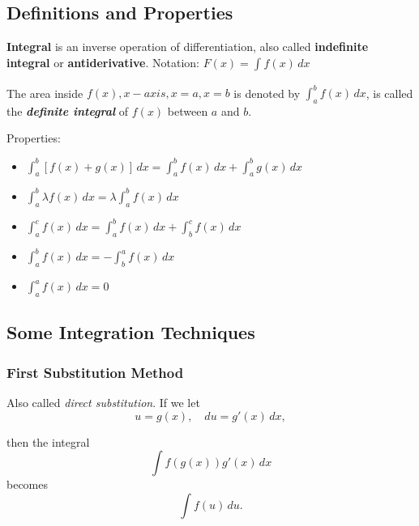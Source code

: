 \subsection{Definitions and Properties}

\begin{definition}
    \textbf{Integral} is an inverse operation of differentiation, also called \textbf{indefinite integral} or \textbf{antiderivative}. Notation: $F(x) = \int_{}^{} f(x) \, dx $
\end{definition}

\begin{definition}
    The area inside $f(x), x-axis, x=a, x=b$ is denoted by $\int_{a}^{b} f(x) \, dx$, is called the \textit{\textbf{definite integral}} of $f(x)$ between $a$ and $b$.
\end{definition}

Properties:
\begin{itemize}
    \item $\int_{a}^{b} [f(x) + g(x)] \, dx = \int_{a}^{b} f(x) \, dx + \int_{a}^{b} g(x) \, dx$
    \item $\int_{a}^{b} \lambda f(x) \, dx = \lambda \int_{a}^{b} f(x) \, dx$
    \item $\int_{a}^{c} f(x) \, dx = \int_{a}^{b} f(x) \, dx + \int_{b}^{c} f(x) \, dx$
    \item $\int_{a}^{b} f(x) \, dx = -\int_{b}^{a} f(x) \, dx$
    \item $\int_{a}^{a} f(x) \, dx = 0$
\end{itemize}

\subsection{Some Integration Techniques}

\subsubsection{First Substitution Method}
Also called \emph{direct substitution}. If we let
\begin{equation*}
    u = g(x), \quad du = g'(x)\, dx,
\end{equation*}

then the integral
\begin{equation*}
    \int f(g(x)) g'(x)\, dx
\end{equation*}
becomes
\begin{equation*}
    \int f(u)\, du.
\end{equation*}

